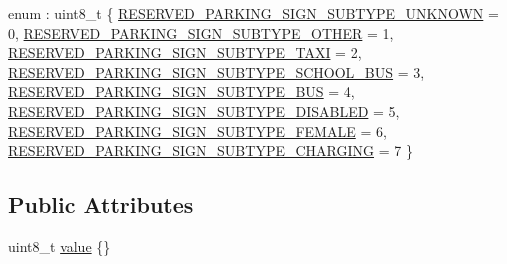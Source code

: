 \begin{DoxyCompactItemize}
\item 
enum \+: uint8\+\_\+t \{ \newline
\hyperlink{structmaf__perception__interface_1_1ReservedParkingSignSubtypeEnum_a1e36b553a13d1022d82911ae567df131a17acfa4bc0d97d9d96d80483e143a1da}{R\+E\+S\+E\+R\+V\+E\+D\+\_\+\+P\+A\+R\+K\+I\+N\+G\+\_\+\+S\+I\+G\+N\+\_\+\+S\+U\+B\+T\+Y\+P\+E\+\_\+\+U\+N\+K\+N\+O\+WN} = 0, 
\hyperlink{structmaf__perception__interface_1_1ReservedParkingSignSubtypeEnum_a1e36b553a13d1022d82911ae567df131a937dea02bcbce001e880c43270d8e851}{R\+E\+S\+E\+R\+V\+E\+D\+\_\+\+P\+A\+R\+K\+I\+N\+G\+\_\+\+S\+I\+G\+N\+\_\+\+S\+U\+B\+T\+Y\+P\+E\+\_\+\+O\+T\+H\+ER} = 1, 
\hyperlink{structmaf__perception__interface_1_1ReservedParkingSignSubtypeEnum_a1e36b553a13d1022d82911ae567df131a4d6e06a78936def2fb5e8283ac0ce0fe}{R\+E\+S\+E\+R\+V\+E\+D\+\_\+\+P\+A\+R\+K\+I\+N\+G\+\_\+\+S\+I\+G\+N\+\_\+\+S\+U\+B\+T\+Y\+P\+E\+\_\+\+T\+A\+XI} = 2, 
\hyperlink{structmaf__perception__interface_1_1ReservedParkingSignSubtypeEnum_a1e36b553a13d1022d82911ae567df131a07d0a19725c2bf743668e98f037328a9}{R\+E\+S\+E\+R\+V\+E\+D\+\_\+\+P\+A\+R\+K\+I\+N\+G\+\_\+\+S\+I\+G\+N\+\_\+\+S\+U\+B\+T\+Y\+P\+E\+\_\+\+S\+C\+H\+O\+O\+L\+\_\+\+B\+US} = 3, 
\newline
\hyperlink{structmaf__perception__interface_1_1ReservedParkingSignSubtypeEnum_a1e36b553a13d1022d82911ae567df131a594d3d2bbe2dbc0456741489d13b6ebb}{R\+E\+S\+E\+R\+V\+E\+D\+\_\+\+P\+A\+R\+K\+I\+N\+G\+\_\+\+S\+I\+G\+N\+\_\+\+S\+U\+B\+T\+Y\+P\+E\+\_\+\+B\+US} = 4, 
\hyperlink{structmaf__perception__interface_1_1ReservedParkingSignSubtypeEnum_a1e36b553a13d1022d82911ae567df131a813cc3e5da29d3ff11a37b4f59485357}{R\+E\+S\+E\+R\+V\+E\+D\+\_\+\+P\+A\+R\+K\+I\+N\+G\+\_\+\+S\+I\+G\+N\+\_\+\+S\+U\+B\+T\+Y\+P\+E\+\_\+\+D\+I\+S\+A\+B\+L\+ED} = 5, 
\hyperlink{structmaf__perception__interface_1_1ReservedParkingSignSubtypeEnum_a1e36b553a13d1022d82911ae567df131a967ef159b0b9750f52be9767a8f93b33}{R\+E\+S\+E\+R\+V\+E\+D\+\_\+\+P\+A\+R\+K\+I\+N\+G\+\_\+\+S\+I\+G\+N\+\_\+\+S\+U\+B\+T\+Y\+P\+E\+\_\+\+F\+E\+M\+A\+LE} = 6, 
\hyperlink{structmaf__perception__interface_1_1ReservedParkingSignSubtypeEnum_a1e36b553a13d1022d82911ae567df131a602b2bd293ba5102306a3e25a7f6c817}{R\+E\+S\+E\+R\+V\+E\+D\+\_\+\+P\+A\+R\+K\+I\+N\+G\+\_\+\+S\+I\+G\+N\+\_\+\+S\+U\+B\+T\+Y\+P\+E\+\_\+\+C\+H\+A\+R\+G\+I\+NG} = 7
 \}
\end{DoxyCompactItemize}
\subsection*{Public Attributes}
\begin{DoxyCompactItemize}
\item 
uint8\+\_\+t \hyperlink{structmaf__perception__interface_1_1ReservedParkingSignSubtypeEnum_a7a5214d895ec0b6633a7d60ab62e86bc}{value} \{\}
\end{DoxyCompactItemize}


